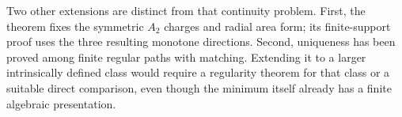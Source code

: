 Two other extensions are distinct from that continuity problem.
First, the theorem fixes the symmetric $A_2$ charges and radial
area form; its finite-support proof uses the three resulting
monotone directions. Second, uniqueness has been proved among
finite regular paths with matching. Extending it to a larger
intrinsically defined class would require a regularity theorem
for that class or a suitable direct comparison, even though the
minimum itself already has a finite algebraic presentation.
